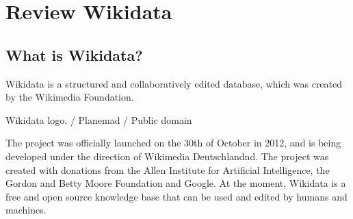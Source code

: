 \setchapterpreamble[u]{\margintoc}
\chapter{Review Wikidata}


\section{What is Wikidata?}
Wikidata is a structured and collaboratively edited database, which was created by the Wikimedia Foundation. \begin{marginfigure}[3.5cm]
{
	\setlength{\fboxsep}{0pt}%
	\setlength{\fboxrule}{1pt}%
}
\caption
{Wikidata logo.  / Planemad / Public domain
}
\label{fig:seyu}
\end{marginfigure}The project was officially launched on the 30th of October in 2012, and is being developed under the direction of Wikimedia Deutschlandnd. The project was created with donations from the Allen Institute for Artificial Intelligence, the Gordon and Betty Moore Foundation and Google. At the moment, Wikidata is a free and open source knowledge base that can be used and edited by humans and machines.

